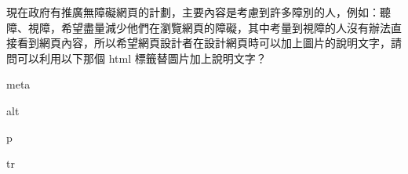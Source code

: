 \ifx\ntpcNinetyTwo\undefined[92學年基北區] \fi
現在政府有推廣無障礙網頁的計劃，主要內容是考慮到許多障別的人，例如：聽障、視障，希望盡量減少他們在瀏覽網頁的障礙，其中考量到視障的人沒有辦法直接看到網頁內容，所以希望網頁設計者在設計網頁時可以加上圖片的說明文字，請問可以利用以下那個 html 標籤替圖片加上說明文字？
  \begin{optionlist}
  \item meta
  \item alt\label{ntpc-92-a30}
  \item p
  \item tr
  \end{optionlist}